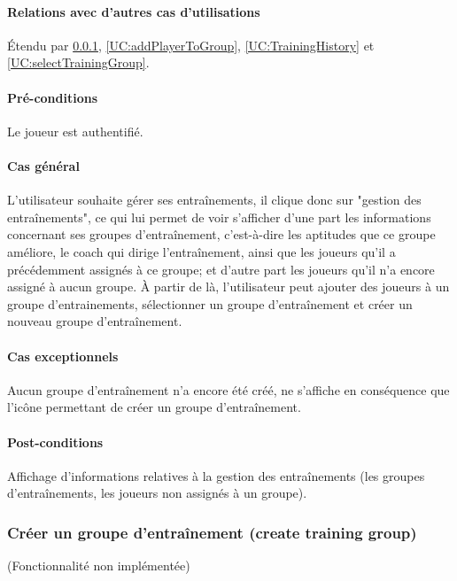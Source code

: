 \paragraph{Relations avec d'autres cas d'utilisations}
Étendu par \ref{UC:createTraining}, \ref{UC:addPlayerToGroup}, \ref{UC:TrainingHistory} et \ref{UC:selectTrainingGroup}.
\paragraph{Pré-conditions}
\begin{list}{}{\leftmargin=1.5em}
\item{Le joueur est authentifié.}
\end{list}
\paragraph{Cas général}
L'utilisateur souhaite gérer ses entraînements, il clique donc sur "gestion des entraînements", ce qui lui permet de voir s'afficher d'une part les informations concernant ses groupes d'entraînement, c'est-à-dire les aptitudes que ce groupe améliore, le coach qui dirige l'entraînement, ainsi que les joueurs qu'il a précédemment assignés à ce groupe; et d'autre part les joueurs qu'il n'a encore assigné à aucun groupe. À partir de là, l'utilisateur peut ajouter des joueurs à un groupe d'entrainements, sélectionner un groupe d'entraînement et créer un nouveau groupe d'entraînement. 
\paragraph{Cas exceptionnels}
Aucun groupe d'entraînement n'a encore été créé, ne s'affiche en conséquence que l'icône permettant de créer un groupe d'entraînement. 
\paragraph{Post-conditions}
\begin{list}{}{\leftmargin=1.5em}
\item{Affichage d'informations relatives à la gestion des entraînements (les groupes d'entraînements, les joueurs non assignés à un groupe).}
\end{list}

\subsubsection{Créer un groupe d'entraînement (create training group)}
\label{UC:createTraining}
(Fonctionnalité non implémentée)

